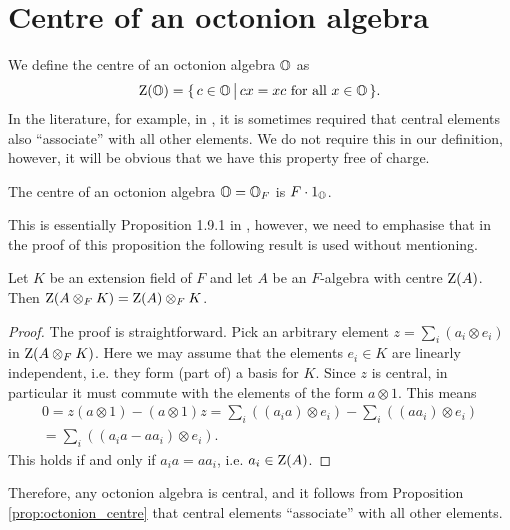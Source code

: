 \section{Centre of an octonion algebra}

We define the centre of an octonion algebra $\mathbb{O}$ as
\begin{equation}
	\label{eq:octonion_centre}
	\mathord{\mathrm{Z}}(\mathbb{O}) = \{\,c \in \mathbb{O}\,\big|\, cx = xc\ \mbox{for all}\ x \in \mathbb{O}\,\}.
\end{equation}
In the literature, for example, in \cite{Schafer}, it is sometimes required that central 
elements also ``associate'' with all other elements. We do not require this in our definition,
however, it will be obvious that we have this property free of charge. 

\begin{proposition}
	\label{prop:octonion_centre}
	The centre of an octonion algebra $\mathbb{O}=\mathbb{O}_F$ is $F\cdot 1_{\mathbb{O}}$.  
\end{proposition}

This is essentially Proposition 1.9.1 in \cite{SpringerVeldkamp}, however, we need to emphasise
that in the proof of this proposition the following result is used without mentioning.

\begin{lemma}
	Let $K$ be an extension field of $F$ and let $A$ be an $F$-algebra with centre $\mathord{\mathrm{Z}}(A)$.
	Then $\mathord{\mathrm{Z}}(A\otimes_F K) = \mathord{\mathrm{Z}}(A)\otimes_F K$. 
\end{lemma}

\begin{proof}
	The proof is straightforward. Pick an arbitrary element $z = \sum_i (a_i \otimes e_i)$ in
	\mbox{$\mathord{\mathrm{Z}}(A\otimes_F K)$}. Here we may assume that the elements $e_i \in K$ are linearly 
	independent, i.e. they form (part of) a basis for $K$. Since $z$ is central, in particular it 
	must commute with the elements of the form $a \otimes 1$. This means
	\begin{align*}
		0 = z (a \otimes 1) - (a\otimes 1) z = \sum_i ( (a_i a) \otimes e_i )
			- \sum_i( (a a_i) \otimes e_i ) \\
		= \sum_i ( (a_i a - a a_i) \otimes e_i ). 
	\end{align*}
	This holds if and only if $a_i a = a a_i$, i.e. $a_i \in \mathord{\mathrm{Z}}(A)$. 
\end{proof}

Therefore, any octonion algebra is central, and it follows from Proposition 
\ref{prop:octonion_centre} that central elements
``associate'' with all other elements.

